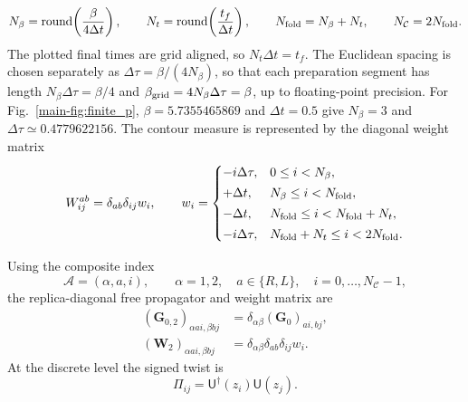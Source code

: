 \documentclass[11pt,a4paper]{article}
\begin{document}
\begin{equation}
  N_\beta
  =
  \operatorname{round}\!\left(\frac{\beta}{4\Delta t}\right),
  \qquad
  N_t
  =
  \operatorname{round}\!\left(\frac{t_f}{\Delta t}\right),
  \qquad
  N_{\rm fold}
  =
  N_\beta+N_t,
  \qquad
  N_{\mathcal C}
  =
  2N_{\rm fold}.
\label{eq:S5-grid-sizes}
\end{equation}
The plotted final times are grid aligned, so \(N_t\Delta t=t_f\).
The Euclidean spacing is chosen separately as
\(\Delta\tau=\beta/(4N_\beta)\), so that each preparation segment
has length \(N_\beta\Delta\tau=\beta/4\) and
\(\beta_{\rm grid}=4N_\beta\Delta\tau=\beta\), up to floating-point precision.
For Fig.~\ref{main-fig:finite_p}, \(\beta=5.7355465869\) and
\(\Delta t=0.5\) give \(N_\beta=3\) and
\(\Delta\tau\simeq0.4779622156\). The contour measure is represented
by the diagonal weight matrix
\begin{equation}
  W^{ab}_{ij}
  =
  \delta_{ab}\delta_{ij}w_i,
  \qquad
  w_i
  =
  \begin{cases}
    -i\Delta\tau,
    &0\leq i<N_\beta,
    \\[2pt]
    +\Delta t,
    &N_\beta\leq i<N_{\rm fold},
    \\[2pt]
    -\Delta t,
    &N_{\rm fold}\leq i<N_{\rm fold}+N_t,
    \\[2pt]
    -i\Delta\tau,
    &N_{\rm fold}+N_t\leq i<2N_{\rm fold}.
  \end{cases}
\label{eq:S5-contour-weights}
\end{equation}

Using the composite index
\[
  \mathcal A=(\alpha,a,i),
  \qquad
  \alpha=1,2,
  \quad
  a\in\{R,L\},
  \quad
  i=0,\ldots,N_{\mathcal C}-1,
\]
the replica-diagonal free propagator and weight matrix are
\begin{equation}
\begin{aligned}
  (\mathbf G_{0,2})_{\alpha a i,\beta b j}
  &=
  \delta_{\alpha\beta}
  (\mathbf G_0)_{a i,b j},
  \\
  (\mathbf W_2)_{\alpha a i,\beta b j}
  &=
  \delta_{\alpha\beta}\delta_{ab}\delta_{ij}w_i .
\end{aligned}
\label{eq:S5-discrete-replica-lift}
\end{equation}
At the discrete level the signed twist is
\begin{equation}
  \Pi_{ij}
  =
  \mathsf U^\dagger(z_i)\mathsf U(z_j).
\label{eq:S5-discrete-twist}
\end{equation}
\end{document}
